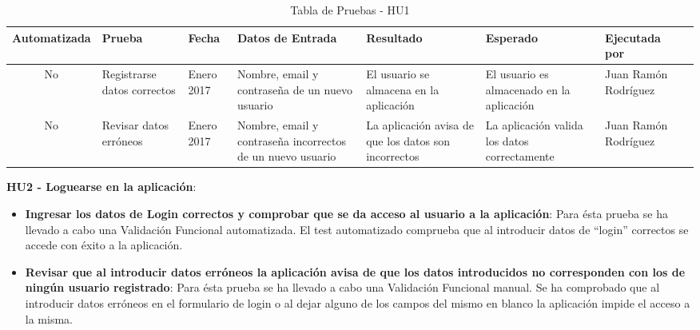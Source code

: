 \documentclass[11pt,openany]{book}
\begin{document}
{\tiny
\setlength{\LTleft}{-20cm plus -1fill}
\setlength{\LTright}{\LTleft}
\begin{center}
\begin{longtable}{| c | M{1.5cm} | M{1.5cm} | M{2.5cm} | M{1.5cm} | M{1.5cm} | M{1.5cm} | M{1.5cm} |}
\caption[Tabla de Pruebas - HU1]{Tabla de Pruebas - HU1} \label{grid_mlmmh} \\

\hline Automatizada & Prueba & Fecha & Datos de Entrada & Resultado & Esperado & Ejecutada por \\
\endfirsthead
\hline
No & Registrarse datos correctos & Enero 2017 & Nombre, email y contraseña de un nuevo usuario & El usuario se almacena en la aplicación & El usuario es almacenado en la aplicación & Juan Ramón Rodríguez \\
\hline
No & Revisar datos erróneos & Enero 2017 & Nombre, email y contraseña incorrectos de un nuevo usuario & La aplicación avisa de que los datos son incorrectos & La aplicación valida los datos correctamente & Juan Ramón Rodríguez \\
\hline
\end{longtable}
\end{center}}
 
\textbf{HU2 - Loguearse en la aplicación}:

\begin{itemize}
\item\textbf{Ingresar los datos de Login correctos y comprobar que se da acceso al usuario a la aplicación}: Para ésta prueba se ha llevado a cabo una Validación Funcional automatizada. El test automatizado comprueba que al introducir datos de ``login'' correctos se accede con éxito a la aplicación.
\item\textbf{Revisar que al introducir datos erróneos la aplicación avisa de que los datos introducidos no corresponden con los de ningún usuario registrado}: Para ésta prueba se ha llevado a cabo una Validación Funcional manual. Se ha comprobado que al introducir datos erróneos en el formulario de login o al dejar alguno de los campos del mismo en blanco la aplicación impide el acceso a la misma.
\end{itemize}
 
\end{document}
